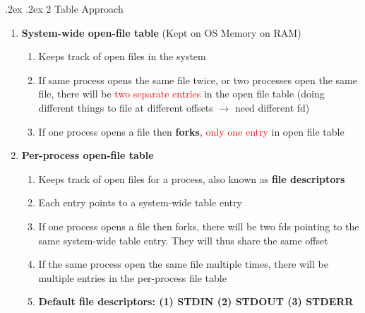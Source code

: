 \documentclass[13pt,landscape,a4paper]{article}
\makeatletter
\newcommand\red[1]{\textcolor{red}{#1}}
\renewcommand{\subsubsection}{\@startsection{subsubsection}{1}{0mm}%
    {.2ex}%
    {.2ex}%
    {\rmfamily\bfseries}}
\makeatother
\begin{document}
\begin{multicols*}{3}
        \subsubsection{2 Table Approach}
        \begin{enumerate}
            \item \textbf{System-wide open-file table} (Kept on OS Memory on RAM)
            \begin{enumerate}
                \item Keeps track of open files in the system
                \item If same process opens the same file twice, or two processes open the same file, there will be \red{two separate entries} in the open file table (doing different things to file at different offsets $\rightarrow$ need different fd)
                \item If one process opens a file then \textbf{forks}, \red{only one entry} in open file table
            \end{enumerate}
            \item \textbf{Per-process open-file table}
            \begin{enumerate}
                \item Keeps track of open files for a process, also known as \textbf{file descriptors}
                \item Each entry points to a system-wide table entry
                \item If one process opens a file then forks, there will be two fds pointing to the same system-wide table entry. They will thus share the same offset
                \item If the same process open the same file multiple times, there will be multiple entries in the per-process file table
                \item \textbf{Default file descriptors: (1) STDIN (2) STDOUT (3) STDERR}
            \end{enumerate}
        \end{enumerate}

\end{multicols*}
\end{document}
